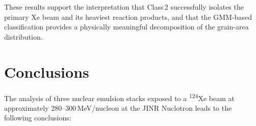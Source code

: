 \documentclass[12pt,a4paper]{article}
\begin{document}
These results support the interpretation that Class\,2 successfully
isolates the primary Xe beam and its heaviest reaction products, and
that the GMM-based classification provides a physically meaningful
decomposition of the grain-area distribution.

\section{Conclusions}
\label{sec:conclusions}

The analysis of three nuclear emulsion stacks exposed to a
\textsuperscript{124}Xe beam at approximately 280--300\,MeV/nucleon at
the JINR Nuclotron leads to the following conclusions:
\end{document}
